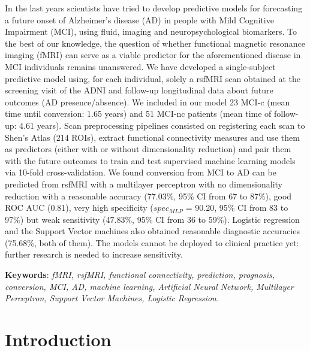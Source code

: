 \documentclass[a4paper,12pt]{elsarticle}  %
\begin{document}
	In the last years scientists have tried to develop predictive models for forecasting a future onset of Alzheimer's disease (AD) in people with Mild Cognitive Impairment (MCI), using fluid, imaging and neuropsychological biomarkers. To the best of our knowledge, the question of whether functional magnetic resonance imaging (fMRI) can serve as a viable predictor for the aforementioned disease in MCI individuals remains unanswered. We have developed a single-subject predictive model using, for each individual, solely a rsfMRI scan obtained at the screening visit of the ADNI and follow-up longitudinal data about future outcomes (AD presence/absence). We included in our model 23 MCI-c (mean time until conversion: 1.65 years) and 51 MCI-nc patients (mean time of follow-up: 4.61 years). Scan preprocessing pipelines consisted on registering each scan to Shen's Atlas (214 ROIs), extract  functional connectivity measures and use them  as predictors (either with or without dimensionality reduction) and pair them with the future outcomes to train and test supervised machine learning models via 10-fold cross-validation. We found conversion from MCI to AD can be predicted from rsfMRI with a multilayer perceptron with no dimensionality reduction with a reasonable accuracy (77.03\%, 95\% CI from 67 to 87\%), good ROC AUC (0.81), very high specificity ($spec_{MLP}$ = 90.20, 95\% CI from 83 to 97\%) but weak sensitivity (47.83\%, 95\% CI from 36 to 59\%). Logistic regression and the Support Vector machines also obtained reasonable diagnostic accuracies (75.68\%, both of them). The models cannot be deployed to clinical practice yet: further research is needed to increase sensitivity.
	
	\textbf{Keywords}: \textit{fMRI, rsfMRI, functional connectivity, prediction, prognosis, conversion, MCI, AD, machine learning, Artificial Neural Network, Multilayer Perceptron, Support Vector Machines, Logistic Regression.}
	
	\clearpage
	
	
	
	
	
	
	\tableofcontents
	
	
	
	
	
	
	
	

\clearpage
\part{Introduction}
\end{document}
